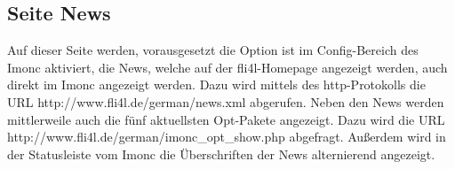   \subsection{Seite News}

  Auf dieser Seite werden, vorausgesetzt die Option ist im Config-Bereich des
  Imonc aktiviert, die News, welche auf der fli4l-Homepage angezeigt werden,
  auch direkt im Imonc angezeigt werden. Dazu wird mittels des http-Protokolls 
  die URL http://www.fli4l.de/german/news.xml abgerufen. Neben den News werden
  mittlerweile auch die fünf aktuellsten Opt-Pakete angezeigt. Dazu wird 
  die URL http://www.fli4l.de/german/imonc\_opt\_show.php abgefragt. Außerdem
  wird in der Statusleiste vom Imonc die Überschriften der News alternierend
  angezeigt.
